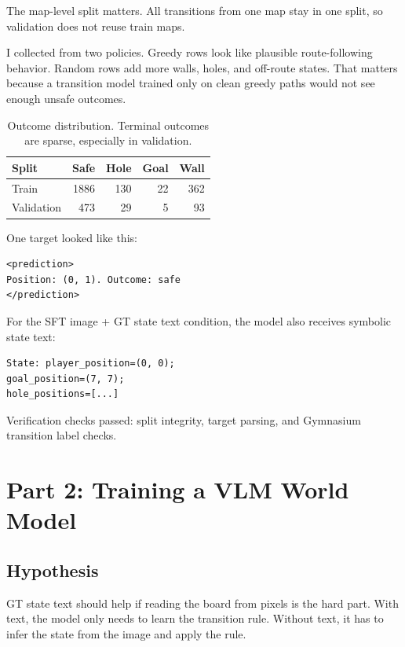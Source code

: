 \documentclass{article}
\begin{document}
The map-level split matters. All transitions from one map stay in one split, so validation does not reuse train maps.

I collected from two policies. Greedy rows look like plausible route-following behavior. Random rows add more walls, holes, and off-route states. That matters because a transition model trained only on clean greedy paths would not see enough unsafe outcomes.

\begin{table}[t]
\caption{Outcome distribution. Terminal outcomes are sparse, especially in validation.}
\label{tab:outcomes}
\centering
\small
\begin{tabular}{lrrrr}
\toprule
Split & Safe & Hole & Goal & Wall \\
\midrule
Train & 1886 & 130 & 22 & 362 \\
Validation & 473 & 29 & 5 & 93 \\
\bottomrule
\end{tabular}
\end{table}

One target looked like this:

\begin{verbatim}
<prediction>
Position: (0, 1). Outcome: safe
</prediction>
\end{verbatim}

For the SFT image + GT state text condition, the model also receives symbolic state text:

\begin{verbatim}
State: player_position=(0, 0);
goal_position=(7, 7);
hole_positions=[...]
\end{verbatim}

Verification checks passed: split integrity, target parsing, and Gymnasium transition label checks.

\section{Part 2: Training a VLM World Model}

\subsection{Hypothesis}

GT state text should help if reading the board from pixels is the hard part. With text, the model only needs to learn the transition rule. Without text, it has to infer the state from the image and apply the rule.
\end{document}
